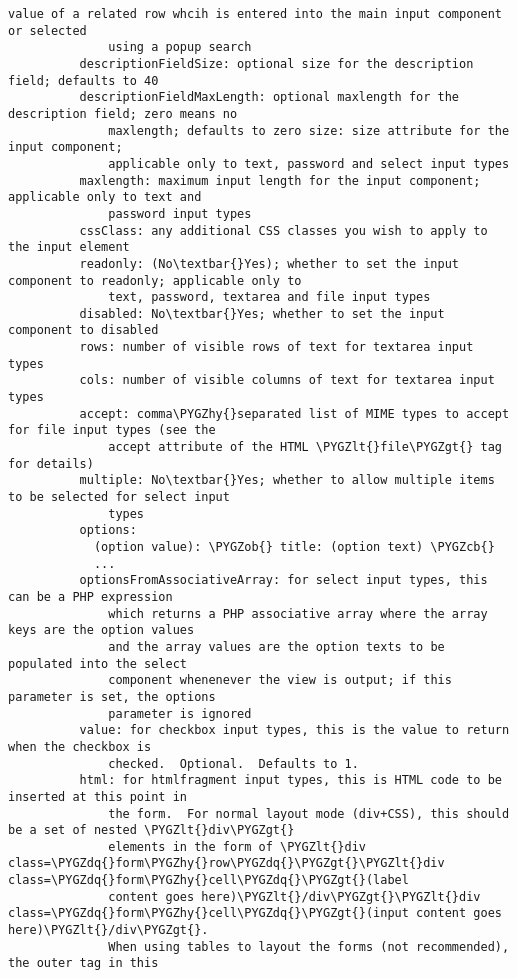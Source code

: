 \documentclass[letterpaper,10pt,english]{sphinxmanual}
\def\PYGZob{\char`\{}
\def\PYGZcb{\char`\}}
\def\PYGZlt{\char`\<}
\def\PYGZgt{\char`\>}
\def\PYGZhy{\char`\-}
\def\PYGZdq{\char`\"}
\begin{document}
\begin{Verbatim}[commandchars=\\\{\}]
              value of a related row whcih is entered into the main input component or selected
              using a popup search
          descriptionFieldSize: optional size for the description field; defaults to 40
          descriptionFieldMaxLength: optional maxlength for the description field; zero means no
              maxlength; defaults to zero size: size attribute for the input component;
              applicable only to text, password and select input types
          maxlength: maximum input length for the input component; applicable only to text and
              password input types
          cssClass: any additional CSS classes you wish to apply to the input element
          readonly: (No\textbar{}Yes); whether to set the input component to readonly; applicable only to
              text, password, textarea and file input types
          disabled: No\textbar{}Yes; whether to set the input component to disabled
          rows: number of visible rows of text for textarea input types
          cols: number of visible columns of text for textarea input types
          accept: comma\PYGZhy{}separated list of MIME types to accept for file input types (see the
              accept attribute of the HTML \PYGZlt{}file\PYGZgt{} tag for details)
          multiple: No\textbar{}Yes; whether to allow multiple items to be selected for select input
              types
          options:
            (option value): \PYGZob{} title: (option text) \PYGZcb{}
            ...
          optionsFromAssociativeArray: for select input types, this can be a PHP expression
              which returns a PHP associative array where the array keys are the option values
              and the array values are the option texts to be populated into the select
              component whenenever the view is output; if this parameter is set, the options
              parameter is ignored
          value: for checkbox input types, this is the value to return when the checkbox is
              checked.  Optional.  Defaults to 1.
          html: for htmlfragment input types, this is HTML code to be inserted at this point in
              the form.  For normal layout mode (div+CSS), this should be a set of nested \PYGZlt{}div\PYGZgt{}
              elements in the form of \PYGZlt{}div class=\PYGZdq{}form\PYGZhy{}row\PYGZdq{}\PYGZgt{}\PYGZlt{}div class=\PYGZdq{}form\PYGZhy{}cell\PYGZdq{}\PYGZgt{}(label
              content goes here)\PYGZlt{}/div\PYGZgt{}\PYGZlt{}div class=\PYGZdq{}form\PYGZhy{}cell\PYGZdq{}\PYGZgt{}(input content goes here)\PYGZlt{}/div\PYGZgt{}.
              When using tables to layout the forms (not recommended), the outer tag in this

\end{Verbatim}
\end{document}
